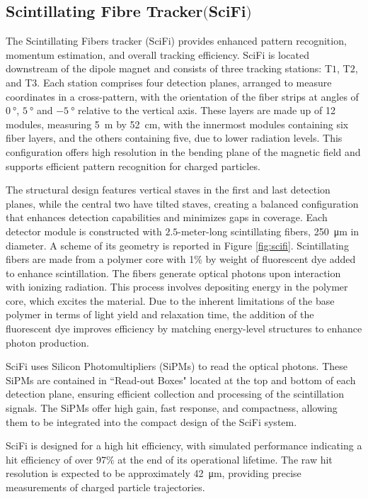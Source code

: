 \subsection[Scintillating Fibre Tracker]{Scintillating Fibre Tracker$ \bigl($SciFi$\bigr)$}
The Scintillating Fibers tracker (SciFi)\cite{scifi} provides enhanced pattern recognition, momentum estimation, and overall tracking efficiency.
SciFi is located downstream of the dipole magnet and consists of three tracking stations: T$1$, T$2$, and T$3$. Each station comprises four detection planes, arranged to measure coordinates in a cross-pattern, with the orientation of the fiber strips at angles of $\SI{0}{\degree}$, $\SI{+5}{\degree}$ and $\SI{-5}{\degree}$ relative to the vertical axis. These layers are made up of 12 modules, measuring \SI{5}{\meter} by \SI{52}{\centi\meter}, with the innermost modules containing six fiber layers, and the others containing five, due to lower radiation levels. This configuration offers high resolution in the bending plane of the magnetic field and supports efficient pattern recognition for charged particles.

The structural design features vertical staves in the first and last detection planes, while the central two have tilted staves, creating a balanced configuration that enhances detection capabilities and minimizes gaps in coverage. Each detector module is constructed with $2.5$-meter-long scintillating fibers, \SI{250}{\micro\meter} in diameter. 
A scheme of its geometry is reported in Figure \ref{fig:scifi}.
Scintillating fibers are made from a polymer core with 1\% by weight of fluorescent dye added to enhance scintillation. The fibers generate optical photons upon interaction with ionizing radiation. This process involves depositing energy in the polymer core, which excites the material. Due to the inherent limitations of the base polymer in terms of light yield and relaxation time, the addition of the fluorescent dye improves efficiency by matching energy-level structures to enhance photon production.

SciFi uses Silicon Photomultipliers (SiPMs) to read the optical photons. These SiPMs are contained in ``Read-out Boxes" located at the top and bottom of each detection plane, ensuring efficient collection and processing of the scintillation signals. The SiPMs offer high gain, fast response, and compactness, allowing them to be integrated into the compact design of the SciFi system.

SciFi is designed for a high hit efficiency, with simulated performance indicating a hit efficiency of over 97\% at the end of its operational lifetime. The raw hit resolution is expected to be approximately \SI{42}{\micro\meter}, providing precise measurements of charged particle trajectories.

